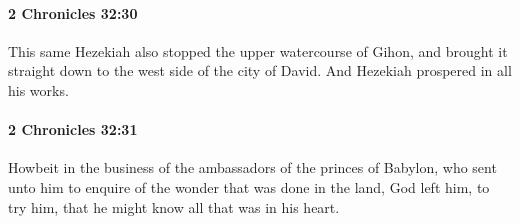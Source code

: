 		\paragraph{2 Chronicles 32:30} %
			\label{2CHRONICLES-32-30}

			This same Hezekiah also stopped the upper watercourse of Gihon, and brought it straight down to the west side of the city of David. And Hezekiah prospered in all his works.


		\paragraph{2 Chronicles 32:31} %
			\label{2CHRONICLES-32-31}

			Howbeit in the business of the ambassadors of the princes of Babylon, who sent unto him to enquire of the wonder that was done in the land, God left him, to try him, that he might know all that was in his heart.

